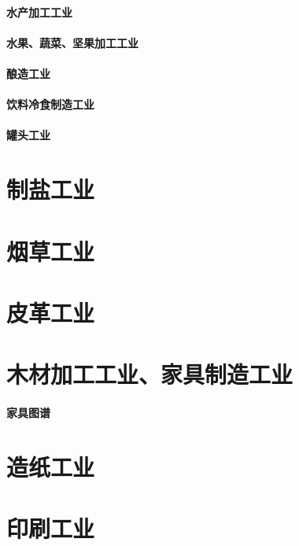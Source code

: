 \documentclass[UTF8]{../../ApplicationUniverse}
\begin{document}
\subsubsection{水产加工工业}
\subsubsection{水果、蔬菜、坚果加工工业}
\subsubsection{酿造工业}
\subsubsection{饮料冷食制造工业}
\subsubsection{罐头工业}




\chapter{制盐工业}



\chapter{烟草工业}


\chapter{皮革工业}


\chapter{木材加工工业、家具制造工业}
\subsubsection{家具图谱}



\chapter{造纸工业}


\chapter{印刷工业}
\end{document}
